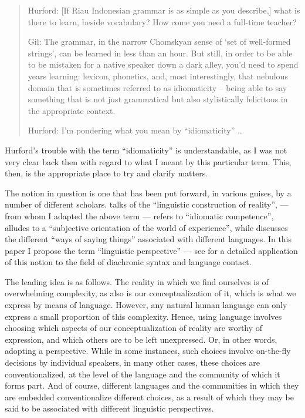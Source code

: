\documentclass[output=paper,colorlinks,citecolor=brown
]{langscibook}
\begin{document}
\begin{quote}
    Hurford:	[If Riau Indonesian grammar is as simple as you describe,] what is there to learn, beside vocabulary? How come you need a full-time teacher?

    Gil: The grammar, in the narrow Chomskyan sense of ‘set of well-formed strings’, can be learned in less than an hour. But still, in order to be able to be mistaken for a native speaker down a dark alley, you’d need to spend years learning: lexicon, phonetics, and, most interestingly, that nebulous domain that is sometimes referred to as idiomaticity – being able to say something that is not just grammatical but also stylistically felicitous in the appropriate context.

    Hurford:	I'm pondering what you mean by ``idiomaticity''  \ldots 
\end{quote}

Hurford's trouble with the term ``idiomaticity'' is understandable, as I was not very clear back then with regard to what I meant by this particular term.  This, then, is the appropriate place to try and clarify matters.

The notion in question is one that has been put forward, in various guises, by a number of different
scholars. \citet{grace1987linguistic} talks of the ``linguistic construction of reality'',
\citet{pawley1993language} — from whom I adapted the above term — refers to ``idiomatic competence'',
\citet[91]{slobin1996thought} alludes to a ``subjective orientation of the world of experience'',
while \citet{ross2001contact} discusses the different ``ways of saying things'' associated with
different languages.  In this paper I propose the term ``linguistic perspective'' — see \citet{gil2023recent} for a detailed application of this notion to the field of diachronic syntax and language contact.

The leading idea is as follows.  The reality in which we find ourselves is of overwhelming complexity, as also is our conceptualization of it, which is what we express by means of language.  However, any natural human language can only express a small proportion of this complexity.  Hence, using language involves choosing which aspects of our conceptualization of reality are worthy of expression, and which others are to be left unexpressed.  Or, in other words, adopting a perspective.  While in some instances, such choices involve on-the-fly decisions by individual speakers, in many other cases, these choices are conventionalized, at the level of the language and the community of which it forms part.  And of course, different languages and the communities in which they are embedded conventionalize different choices, as a result of which they may be said to be associated with different linguistic perspectives.
\end{document}
